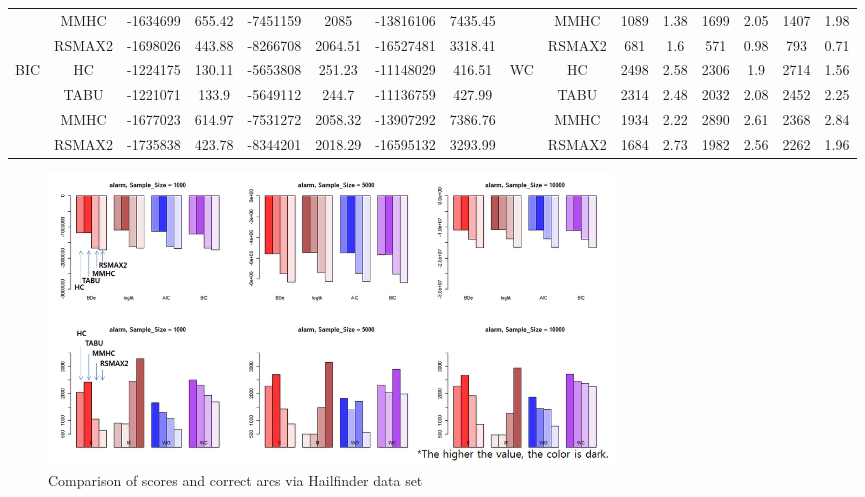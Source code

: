 \begin{table}[p]
{\begin{tabular}{cc||cc|cc|cc||cc|cc|cc|cc}
& MMHC &	-1634699 & 	655.42 & 	-7451159 & 	2085 & 	-13816106 & 	7435.45 & 	& MMHC &	1089 & 	1.38 & 	1699 & 	2.05 & 	1407 & 	1.98\tabularnewline													
& RSMAX2 &	-1698026 & 	443.88 & 	-8266708 & 	2064.51 & 	-16527481 & 	3318.41 & 	& RSMAX2 &	681 & 	1.6 & 	571 & 	0.98 & 	793 & 	0.71\tabularnewline													
\hline																										
\multirow{4}{*}{BIC} & HC &	-1224175 & 	130.11 & 	-5653808 & 	251.23 & 	-11148029 & 	416.51 & 	\multirow{4}{*}{WC} & HC &	2498 & 	2.58 & 	2306 & 	1.9 & 	2714 & 	1.56\tabularnewline													
& TABU &	-1221071 & 	133.9 & 	-5649112 & 	244.7 & 	-11136759 & 	427.99 & 	& TABU &	2314 & 	2.48 & 	2032 & 	2.08 & 	2452 & 	2.25\tabularnewline													
& MMHC &	-1677023 & 	614.97 & 	-7531272 & 	2058.32 & 	-13907292 & 	7386.76 & 	& MMHC &	1934 & 	2.22 & 	2890 & 	2.61 & 	2368 & 	2.84\tabularnewline													
& RSMAX2 &	-1735838 & 	423.78 & 	-8344201 & 	2018.29 & 	-16595132 & 	3293.99 & 	& RSMAX2 &	1684 & 	2.73 & 	1982 & 	2.56 & 	2262 & 	1.96\tabularnewline													
\hline																										
\end{tabular}																										
}																										
\end{table}

	\begin{figure}[p]
	\centering
		\includegraphics[height=220pt]{images/Real_3_Alarm}
		\caption{Comparison of scores and correct arcs via Hailfinder data set}
	\end{figure}	
